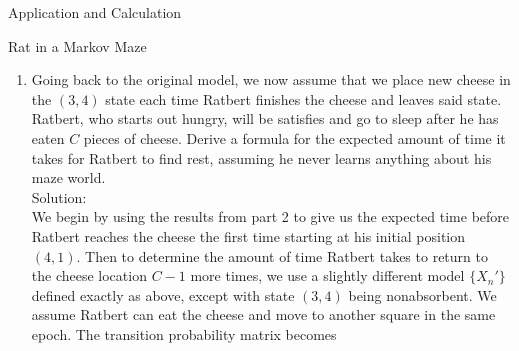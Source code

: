 \documentclass[12pt]{article}
\numberwithin{equation}{section}
\begin{document}
\begin{section}{Application and Calculation}
\begin{subsection}{Rat in a Markov Maze}
\begin{enumerate}
        \item Going back to the original model, we now assume that we place new cheese in the $(3,4)$ state each time Ratbert finishes the cheese and leaves said state. Ratbert, who starts out hungry, will be satisfies and go to sleep after he has eaten $C$ pieces of cheese. Derive a formula for the expected amount of time it takes for Ratbert to find rest, assuming he never learns anything about his maze world.\\

            Solution:\\

            We begin by using the results from part 2 to give us the expected time before Ratbert reaches the cheese the first time starting at his initial position $(4,1)$. Then to determine the amount of time Ratbert takes to return to the cheese location $C-1$ more times, we use a slightly different model $\{X_n'\}$ defined exactly as above, except with state $(3,4)$ being nonabsorbent. We assume Ratbert can eat the cheese and move to another square in the same epoch. The transition probability matrix becomes


\end{enumerate}
\end{subsection}
\end{section}
\end{document}
